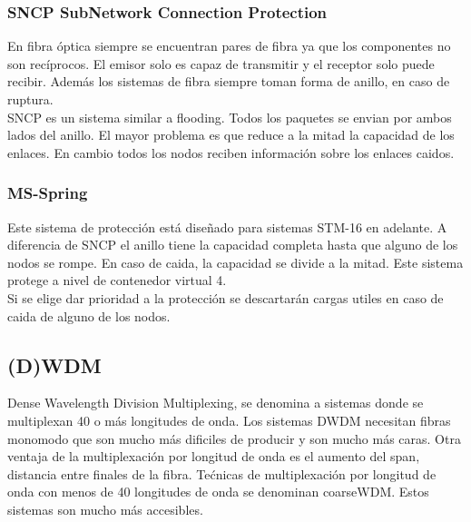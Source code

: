 \subsubsection{SNCP SubNetwork Connection Protection}
En fibra óptica siempre se encuentran pares de fibra ya que los componentes no son recíprocos. El emisor solo es capaz de transmitir y el receptor solo puede recibir. Además los sistemas de fibra siempre toman forma de anillo, en caso de ruptura.\\
SNCP es un sistema similar a flooding. Todos los paquetes se envian por ambos lados del anillo. El mayor problema es que reduce a la mitad la capacidad de los enlaces. En cambio todos los nodos reciben información sobre los enlaces caidos.
\subsubsection{MS-Spring}
Este sistema de protección está diseñado para sistemas STM-16 en adelante. A diferencia de SNCP el anillo tiene la capacidad completa hasta que alguno de los nodos se rompe. En caso de caida, la capacidad se divide a la mitad. Este sistema protege a nivel de contenedor virtual 4. \\
Si se elige dar prioridad a la protección se descartarán cargas utiles en caso de caida de alguno de los nodos.
\subsection{(D)WDM}
Dense Wavelength Division Multiplexing, se denomina a sistemas donde se multiplexan 40 o más longitudes de onda. Los sistemas DWDM necesitan fibras monomodo que son mucho más dificiles de producir y son mucho más caras. Otra ventaja de la multiplexación por longitud de onda es el aumento del span, distancia entre finales de la fibra. Tećnicas de multiplexación por longitud de onda con menos de 40 longitudes de onda se denominan coarseWDM. Estos sistemas son mucho más accesibles.